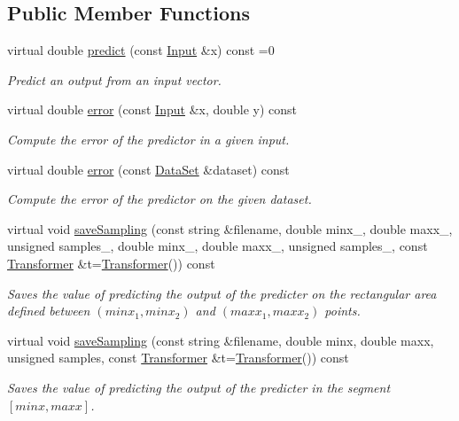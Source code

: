 \subsection*{Public Member Functions}
\begin{DoxyCompactItemize}
\item 
virtual double \hyperlink{classhappyml_1_1Predictor_a07cf89d655e7642fd94c9b2a8fd0a04b}{predict} (const \hyperlink{namespacehappyml_a03602d1ec49393790b8a0449f40cd01f}{Input} \&x) const  =0
\begin{DoxyCompactList}\small\item\em Predict an output from an input vector. \end{DoxyCompactList}\item 
virtual double \hyperlink{classhappyml_1_1Predictor_aeb20c07843cf4a2b7df76b2f0d0e0b13}{error} (const \hyperlink{namespacehappyml_a03602d1ec49393790b8a0449f40cd01f}{Input} \&x, double y) const 
\begin{DoxyCompactList}\small\item\em Compute the error of the predictor in a given input. \end{DoxyCompactList}\item 
virtual double \hyperlink{classhappyml_1_1Predictor_a59b022fac2ffa3a0254b75cb02b70dfe}{error} (const \hyperlink{classhappyml_1_1DataSet}{Data\+Set} \&dataset) const 
\begin{DoxyCompactList}\small\item\em Compute the error of the predictor on the given dataset. \end{DoxyCompactList}\item 
virtual void \hyperlink{classhappyml_1_1Predictor_a57e1704162af45ff6501a49c2cd3dada}{save\+Sampling} (const string \&filename, double minx\+\_, double maxx\+\_, unsigned samples\+\_, double minx\+\_, double maxx\+\_, unsigned samples\+\_, const \hyperlink{classhappyml_1_1Transformer}{Transformer} \&t=\hyperlink{classhappyml_1_1Transformer}{Transformer}()) const 
\begin{DoxyCompactList}\small\item\em Saves the value of predicting the output of the predicter on the rectangular area defined between $(minx_1, minx_2)$ and $(maxx_1, maxx_2)$ points. \end{DoxyCompactList}\item 
virtual void \hyperlink{classhappyml_1_1Predictor_a7be2a09809a15f9eef51ca37c4632cb7}{save\+Sampling} (const string \&filename, double minx, double maxx, unsigned samples, const \hyperlink{classhappyml_1_1Transformer}{Transformer} \&t=\hyperlink{classhappyml_1_1Transformer}{Transformer}()) const 
\begin{DoxyCompactList}\small\item\em Saves the value of predicting the output of the predicter in the segment $[minx, maxx]$. \end{DoxyCompactList}\end{DoxyCompactItemize}


